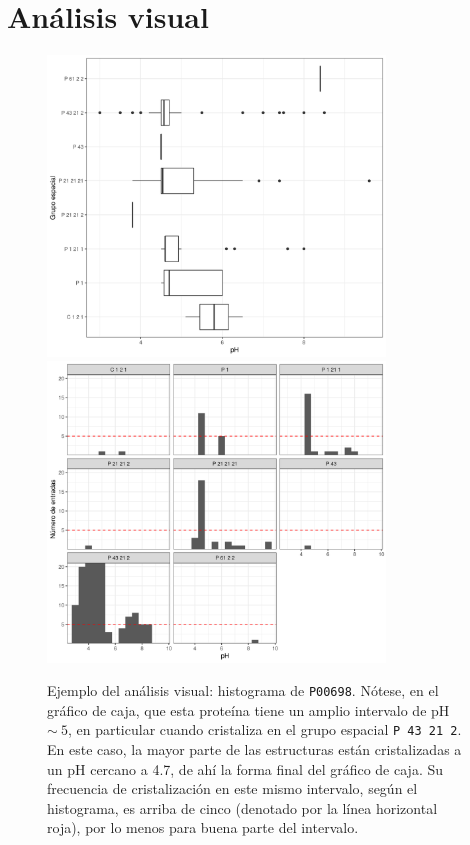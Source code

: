 \chapter{Análisis visual}
\begin{figure}[h!]
	\centering
	\includegraphics[width=0.8\textwidth]{imgs/box_pH_by_gpo_P00698}
	\includegraphics[width=0.8\textwidth]{imgs/hist_pH_by_gpo_P00698}
	\caption[Análisis visual]{Ejemplo del análisis visual: histograma de \texttt{P00698}. Nótese, en el gráfico de caja, que esta proteína tiene un amplio intervalo de pH $\sim~5$, en particular cuando cristaliza en el grupo espacial \texttt{P 43 21 2}. En este caso, la mayor parte de las estructuras están cristalizadas a un pH cercano a \num{4.7}, de ahí la forma final del gráfico de caja. Su frecuencia de cristalización en este mismo intervalo, según el histograma, es arriba de cinco (denotado por la línea horizontal roja), por lo  menos para buena parte del intervalo.}
\end{figure}
